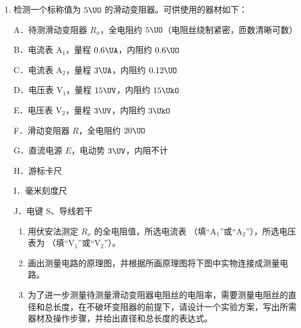 \documentclass[\gkver]{gaokaozhenti}
\begin{document}
\begin{enumerate}
{飞船在 Gliese581c 表面附近运行时的速度大于 $7.9\Ukms$}
{人在 Gliese581c 上所受重力比在地球上所受重力大}
{Gliese581c 的平均密度比地球平均密度小}


\item
检测一个标称值为 $5\UO$ 的滑动变阻器。可供使用的器材如下：

A．待测滑动变阻器 $R_{x}$，全电阻约 $5\UO$（电阻丝绕制紧密，匝数清晰可数）

B．电流表 $\mathrm{A}_{1}$，量程 $0.6\UA$，内阻约 $0.6\UO$

C．电流表 $\mathrm{A}_{2}$，量程 $3\UA$，内阻约 $0.12\UO$

D．电压表 $\mathrm{V}_{1}$，量程 $15\UV$，内阻约 $15\UkO$

E．电压表 $\mathrm{V}_{2}$，量程 $3\UV$，内阻约 $3\UkO$

F．滑动变阻器 $R$，全电阻约 $20\UO$

G．直流电源 $E$，电动势 $3\UV$，内阻不计

H．游标卡尺

I．毫米刻度尺

J．电键 S、导线若干

\begin{enumerate}
	\item
	用伏安法测定 $R_{x}$ 的全电阻值，所选电流表 （填“A$_{1}$”或“A$_{2}$”），所选电压表为 （填“V$_{1}$”或“V$_{2}$”）。

	\item
	画出测量电路的原理图，并根据所画原理图将下图中实物连接成测量电路。


	\item
	为了进一步测量待测量滑动变阻器电阻丝的电阻率，需要测量电阻丝的直径和总长度，在不破坏变阻器的前提下，请设计一个实验方案，写出所需器材及操作步骤，并给出直径和总长度的表达式。
\end{enumerate}



\end{enumerate}
\end{document}
